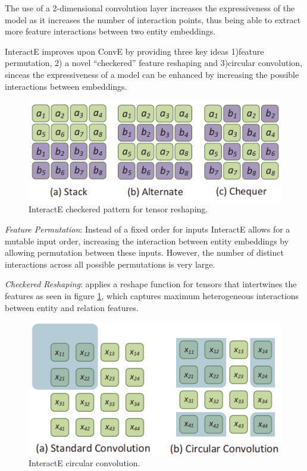 The use of a 2-dimensional convolution layer increases the expressiveness of the model as it increases the number of interaction points, thus being able to extract more feature interactions between two entity embeddings.

InteractE \cite{vashishth2020interacte} improves upon ConvE by providing three key ideas 1)feature permutation, 2) a novel ``checkered'' feature reshaping and 3)circular convolution, sinceas the expressiveness of a model can be enhanced by increasing the possible interactions between embeddings.

\begin{figure}[!ht]
    \centering
    \includegraphics[width=.65\textwidth]{fig/embeddings/InteractE.png}
    \caption{InteractE checkered pattern \cite{vashishth2020interacte} for tensor reshaping.}
    \label{fig:emb-interactE}
\end{figure}

\textit{Feature Permutation}: Instead of a fixed order for inputs InteractE allows for a mutable input order, increasing the interaction between entity embeddings by allowing permutation between these inputs. However, the number of distinct interactions across all possible permutations is very large. 

\textit{Checkered Reshaping}: applies a reshape function for tensors that intertwines the features as seen in figure \ref{fig:emb-interactE}, which captures maximum heterogeneous interactions between entity and relation features.

\begin{figure}[!ht]
    \centering
    \includegraphics[width=.65\textwidth]{fig/embeddings/interactE_convolutions.png}
    \caption{InteractE circular convolution. \cite{vashishth2020interacte}}
    \label{fig:emb-interactE_conv}
\end{figure}

